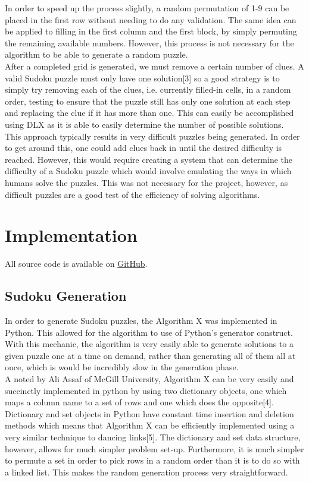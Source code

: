 \documentclass[12pt]{article}
\newcounter{row}
\newcounter{col}
\begin{document}
In order to speed up the process slightly, a random permutation of 1-9 can be placed in the first row without needing to do any validation. The same idea can be applied to filling in the first column and the first block, by simply permuting the remaining available numbers. However, this process is not necessary for the algorithm to be able to generate a random puzzle.\\

After a completed grid is generated, we must remove a certain number of clues. A valid Sudoku puzzle must only have one solution[3] so a good strategy is to simply try removing each of the clues, i.e. currently filled-in cells, in a random order, testing to ensure that the puzzle still has only one solution at each step and replacing the clue if it has more than one. This can easily be accomplished using DLX as it is able to easily determine the number of possible solutions. \\

This approach typically results in very difficult puzzles being generated. In order to get around this, one could add clues back in until the desired difficulty is reached. However, this would require creating a system that can determine the difficulty of a Sudoku puzzle which would involve emulating the ways in which humans solve the puzzles. This was not necessary for the project, however, as difficult puzzles are a good test of the efficiency of solving algorithms.

\section{Implementation}
All source code is available on \href{https://github.com/smaskell/Sudoku}{GitHub}.
\subsection{Sudoku Generation}
In order to generate Sudoku puzzles, the Algorithm X was implemented in Python. This allowed for the algorithm to use of Python's generator construct. With this mechanic, the algorithm is very easily able to generate solutions to a given puzzle one at a time on demand, rather than generating all of them all at once, which is would be incredibly slow in the generation phase. \\

A noted by Ali Assaf of McGill University, Algorithm X can be very easily and succinctly implemented in python by using two dictionary objects, one which maps a column name to a set of rows and one which does the opposite[4]. Dictionary and set objects in Python have constant time insertion and deletion methods which means that Algorithm X can be efficiently implemented using a very similar technique to dancing links[5]. The dictionary and set data structure, however, allows for much simpler problem set-up. Furthermore, it is much simpler to permute a set in order to pick rows in a random order than it is to do so with a linked list. This makes the random generation process  very straightforward.\\
\end{document}
